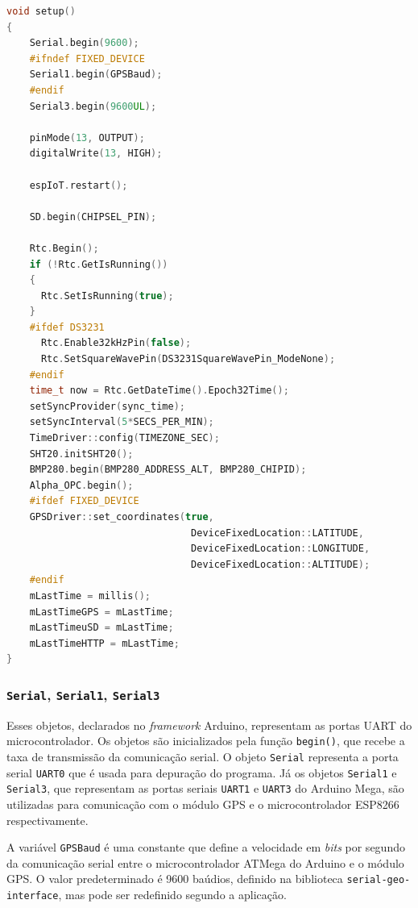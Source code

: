 \begin{lstlisting}[language=C++, caption=Definição dos identificadores dos sensores de um dispositivo]
void setup()
{  
    Serial.begin(9600);
    #ifndef FIXED_DEVICE
    Serial1.begin(GPSBaud);
    #endif
    Serial3.begin(9600UL);
    
    pinMode(13, OUTPUT);
    digitalWrite(13, HIGH);
    
    espIoT.restart();
    
    SD.begin(CHIPSEL_PIN);
    
    Rtc.Begin();
    if (!Rtc.GetIsRunning())
    {
      Rtc.SetIsRunning(true);
    }
    #ifdef DS3231
      Rtc.Enable32kHzPin(false);
      Rtc.SetSquareWavePin(DS3231SquareWavePin_ModeNone);
    #endif
    time_t now = Rtc.GetDateTime().Epoch32Time();
    setSyncProvider(sync_time);
    setSyncInterval(5*SECS_PER_MIN);
    TimeDriver::config(TIMEZONE_SEC);
    SHT20.initSHT20();
    BMP280.begin(BMP280_ADDRESS_ALT, BMP280_CHIPID);
    Alpha_OPC.begin();
    #ifdef FIXED_DEVICE
    GPSDriver::set_coordinates(true, 
                                DeviceFixedLocation::LATITUDE,
                                DeviceFixedLocation::LONGITUDE, 
                                DeviceFixedLocation::ALTITUDE); 
    #endif
    mLastTime = millis();
    mLastTimeGPS = mLastTime;
    mLastTimeuSD = mLastTime;
    mLastTimeHTTP = mLastTime;
}
\end{lstlisting}
\label{code: setup-func}

\subsubsection{\texttt{Serial}, \texttt{Serial1}, \texttt{Serial3}}

Esses objetos, declarados no \textit{framework} Arduino, representam as portas UART do microcontrolador. Os objetos são inicializados pela função \texttt{begin()}, que recebe a taxa de transmissão da comunicação serial. O objeto \texttt{Serial} representa a porta serial \texttt{UART0} que é usada para depuração do programa. Já os objetos \texttt{Serial1} e \texttt{Serial3}, que representam as portas seriais \texttt{UART1} e \texttt{UART3} do Arduino Mega, são utilizadas para comunicação com o módulo GPS e o microcontrolador ESP8266 respectivamente.

A variável \texttt{GPSBaud} é uma constante que define a velocidade em \textit{bits} por segundo da comunicação serial entre o microcontrolador ATMega do Arduino e o módulo GPS. O valor predeterminado é 9600 baúdios, definido na biblioteca \texttt{serial-geo-interface}, mas pode ser redefinido segundo a aplicação. 

